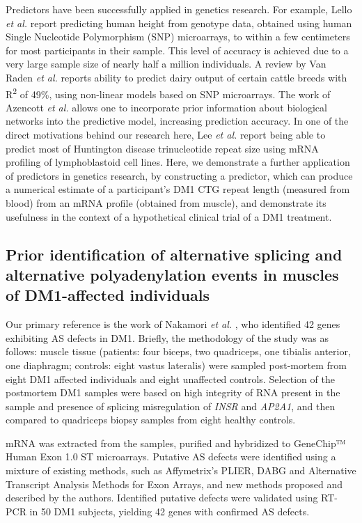 \documentclass[10pt,letterpaper]{article}
\begin{document}
Predictors have been successfully applied in genetics research. For example, Lello {\it et al.} \cite{Lello2017} report predicting human height from genotype data, obtained using human Single Nucleotide Polymorphism (SNP) microarrays, to within a few centimeters for most participants in their sample. This level of accuracy is achieved due to a very large sample size of nearly half a million individuals. A review by Van Raden {\it et al.} \cite{VanRaden2009} reports ability to predict dairy output of certain cattle breeds with R\textsuperscript{2} of 49\%, using non-linear models based on SNP microarrays. The work of Azencott {\it et al.} \cite{Azencott2013} allows one to incorporate prior information about biological networks into the predictive model, increasing prediction accuracy. In one of the direct motivations behind our research here, Lee {\it et al.} \cite{Lee2013} report being able to predict most of Huntington disease trinucleotide repeat size using mRNA profiling of lymphoblastoid cell lines. Here, we demonstrate a further application of predictors in genetics research, by constructing a predictor, which can produce a numerical estimate of a participant's DM1 CTG repeat length (measured from blood) from an mRNA profile (obtained from muscle), and demonstrate its usefulness in the context of a hypothetical clinical trial of a DM1 treatment.

\subsection*{Prior identification of alternative splicing and alternative polyadenylation events in muscles of DM1-affected individuals}\label{prior_work}

Our primary reference is the work of Nakamori {\it et al.} \cite{Nakamori2013}, who identified 42 genes exhibiting AS defects in DM1. Briefly, the methodology of the study was as follows: muscle tissue (patients: four biceps, two quadriceps, one tibialis anterior, one diaphragm; controls: eight vastus lateralis) were sampled post-mortem from eight DM1 affected individuals and eight unaffected controls. Selection of the postmortem DM1 samples were based on high integrity of RNA present in the sample and presence of splicing misregulation of {\it INSR} and {\it AP2A1}, and then compared to quadriceps biopsy samples from eight healthy controls.

mRNA was extracted from the samples, purified and hybridized to GeneChip™ Human Exon 1.0 ST microarrays.
Putative AS defects were identified using a mixture of existing methods, such as Affymetrix's PLIER, DABG and Alternative Transcript Analysis Methods for Exon Arrays, and new methods proposed and described by the authors. Identified putative defects were validated using RT-PCR in 50 DM1 subjects, yielding 42 genes with confirmed AS defects.
\end{document}
